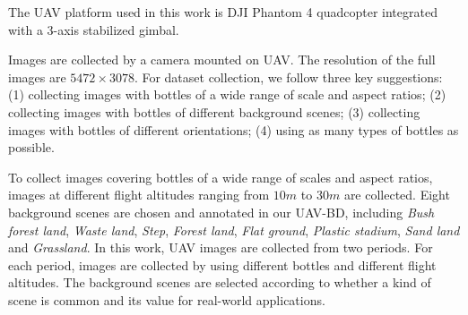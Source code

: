 %	
%	
%	



The UAV platform used in this work is DJI Phantom 4 quadcopter integrated with a 3-axis stabilized gimbal.

Images are collected by a camera mounted on UAV. The resolution of the full images are $ 5472\times 3078 $. For dataset collection, we follow three key suggestions: (1) collecting images with bottles of a wide range of scale and aspect ratios; (2) collecting images with bottles of different background scenes; (3) collecting images with bottles of different orientations; (4) using as many types of bottles as possible. 


To collect images covering bottles of a wide range of scales and aspect ratios, images at different flight altitudes ranging from $ 10m $ to $ 30m $ are collected. Eight background scenes are chosen and annotated in our UAV-BD, including \textit{Bush forest land}, \textit{Waste land}, \textit{Step}, \textit{Forest land}, \textit{Flat ground}, \textit{Plastic stadium}, \textit{Sand land} and \textit{Grassland}. In this work, UAV images are collected from two periods. For each period, images are collected by using different bottles and different flight altitudes. The background scenes are selected according to whether a kind of scene is common and its value for real-world applications\cite{DOTA}.

